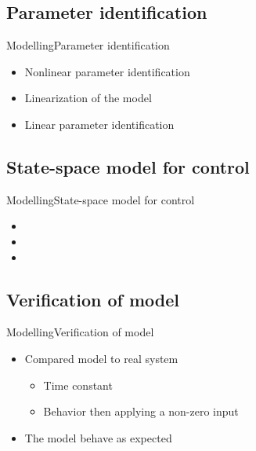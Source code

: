 

\subsection{Parameter identification}

\begin{frame}{Modelling}{Parameter identification}
\begin{itemize}
	\item<1-> Nonlinear parameter identification
	\item<1-> Linearization of the model 
	\item<1-> Linear parameter identification
\end{itemize}
\end{frame}

\subsection{State-space model for control}

\begin{frame}{Modelling}{State-space model for control}
\begin{itemize}
	\item<1-> 
	\item<1-> 
	\item<1-> 
\end{itemize}
\end{frame}

\subsection{Verification of model}

\begin{frame}{Modelling}{Verification of model}
\begin{itemize}
	\item<1-> Compared model to real system
	\begin{itemize}
		\item<1-> Time constant 
		\item<1-> Behavior then applying a non-zero input
	\end{itemize}
\end{itemize}
\begin{itemize}
	\item<1-> The model behave as expected
\end{itemize}

\begin{figure}[H]
   \centering
    
\end{figure}

\end{frame}




